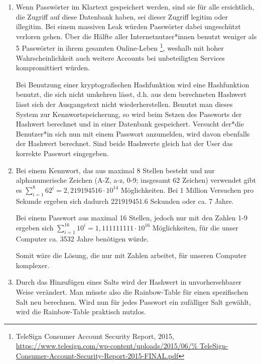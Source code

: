 \documentclass[a4paper,11pt]{scrartcl}
\begin{document}
\begin{enumerate}[2.]
    \item
        Wenn Passwörter im Klartext gespeichert werden, sind sie für alle
        ersichtlich, die Zugriff auf diese Datenbank haben, sei dieser Zugriff
        legitim oder illegitim. Bei einem massiven Leak würden Passwörter
        dabei ungeschützt verloren gehen. Über die Hälfte aller Internetnutzer*innen
        benutzt weniger als 5 Passwörter in ihrem gesamten Online-Leben%
        \footnote{TeleSign Consumer Account Security Report, 2015,\\%
        \url{https://www.telesign.com/wp-content/uploads/2015/06/%
        TeleSign-Consumer-Account-Security-Report-2015-FINAL.pdf}},
        weshalb mit hoher Wahrscheinlichkeit auch weitere Accounts bei unbeteiligten
        Services kompromittiert würden.

        Bei Benutzung einer kryptografischen Hashfunktion wird eine Hashfunktion
        benutzt, die sich nicht umkehren lässt, d.h. aus dem berechneten
        Hashwert lässt sich der Ausgangstext nicht wiederherstellen. Benutzt man
        dieses System zur Kennwortspeicherung, so wird beim Setzen des Passworts
        der Hashwert berechnet und in einer Datenbank gespeichert. Versucht der*die
        Benutzer*in sich nun mit einem Passwort anzumelden, wird davon ebenfalls
        der Hashwert berechnet. Sind beide Hashwerte gleich hat der User das
        korrekte Passwort eingegeben.

    \item 
    	Bei einem Kennwort, das aus maximal 8 Stellen besteht und nur alphanumerische
        Zeichen (A-Z, a-z, 0-9; insgesamt 62 Zeichen) verwendet gibt es
        \(\sum_{i=1}^{8} 62^i = 2,219194516 \cdot 10^{14}\) Möglichkeiten.
        Bei 1 Million Versuchen pro Sekunde ergeben sich dadurch \(221919451.6\) Sekunden oder ca. 7 Jahre.

    	Bei einem Passwort aus maximal 16 Stellen, jedoch nur mit den Zahlen 1-9
        ergeben sich \(\sum_{i=1}^{16} 10^i = 1,111111111 \cdot 10^{16}\) Möglichkeiten,
    	für die unser Computer ca. 3532 Jahre benötigen würde.
    	
    	Somit wäre die Lösung, die nur mit Zahlen arbeitet, für unseren Computer
    	komplexer.

    \item
        Durch das Hinzufügen eines Salts wird der Hashwert in unvorhersehbarer
        Weise verändert. Man müsste also die Rainbow-Table für einen spezifischen
        Salt neu berechnen. Wird nun für jedes Passwort ein zufälliger Salt
        gewählt, wird die Rainbow-Table praktisch nutzlos.


\end{enumerate}
\end{document}
